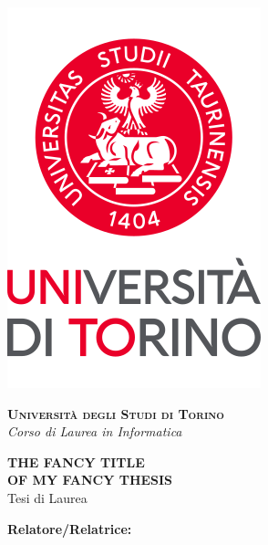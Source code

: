 \begin{titlepage}

    \begin{center}
        \includegraphics[scale=.3]{head/logo.png}
    \end{center}
    \begin{center}
        \vspace{20mm}
        {{\Large{\textsc{\bf Universit\`a degli Studi di Torino \\} \vspace{2mm} \emph{Corso di Laurea in Informatica}}}}
        \vspace{5mm}
    \end{center}
    \begin{center}
        \vspace{5mm}
        {\LARGE{\bf THE FANCY TITLE\\ OF MY FANCY THESIS\\}}
        \vspace{3mm}
        {\large{Tesi di Laurea\\}}
    \end{center}
    \vspace{20mm}
    \par
    \noindent
    \begin{minipage}[t]{0.47\textwidth}
        {\large{\bf Relatore/Relatrice:\\}}

\end{minipage}
\end{titlepage}
